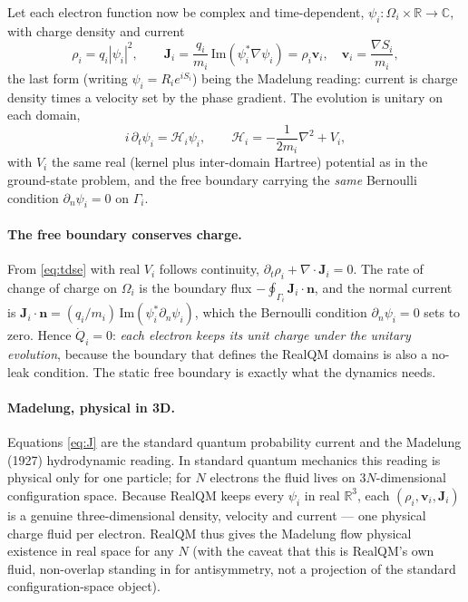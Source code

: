 \documentclass[11pt]{article}
\begin{document}
Let each electron function now be complex and time-dependent, $\psi_i:\Omega_i\times\mathbb R\to\mathbb C$,
with charge density and current
\begin{equation}
\rho_i=q_i|\psi_i|^2,\qquad
\mathbf J_i=\frac{q_i}{m_i}\,\mathrm{Im}(\psi_i^*\nabla\psi_i)=\rho_i\mathbf v_i,\quad
\mathbf v_i=\frac{\nabla S_i}{m_i},
\label{eq:J}
\end{equation}
the last form (writing $\psi_i=R_i e^{iS_i}$) being the Madelung reading: current is charge density times
a velocity set by the phase gradient. The evolution is unitary on each domain,
\begin{equation}
i\,\partial_t\psi_i=\mathcal H_i\psi_i,\qquad
\mathcal H_i=-\frac{1}{2m_i}\nabla^2+V_i,
\label{eq:tdse}
\end{equation}
with $V_i$ the same real (kernel plus inter-domain Hartree) potential as in the ground-state problem, and
the free boundary carrying the \emph{same} Bernoulli condition $\partial_n\psi_i=0$ on $\Gamma_i$.

\paragraph{The free boundary conserves charge.} From \eqref{eq:tdse} with real $V_i$ follows continuity,
$\partial_t\rho_i+\nabla\!\cdot\!\mathbf J_i=0$. The rate of change of charge on $\Omega_i$ is the boundary
flux $-\oint_{\Gamma_i}\mathbf J_i\!\cdot\!\mathbf n$, and the normal current is
$\mathbf J_i\!\cdot\!\mathbf n=(q_i/m_i)\,\mathrm{Im}(\psi_i^*\partial_n\psi_i)$, which the Bernoulli
condition $\partial_n\psi_i=0$ sets to zero. Hence $\dot Q_i=0$: \emph{each electron keeps its unit charge
under the unitary evolution}, because the boundary that defines the RealQM domains is also a no-leak
condition. The static free boundary is exactly what the dynamics needs.

\paragraph{Madelung, physical in 3D.} Equations \eqref{eq:J} are the standard quantum probability current
and the Madelung (1927) hydrodynamic reading. In standard quantum mechanics this reading is physical only
for one particle; for $N$ electrons the fluid lives on $3N$-dimensional configuration space. Because
RealQM keeps every $\psi_i$ in real $\mathbb R^3$, each $(\rho_i,\mathbf v_i,\mathbf J_i)$ is a genuine
three-dimensional density, velocity and current --- one physical charge fluid per electron. RealQM thus
gives the Madelung flow physical existence in real space for any $N$ (with the caveat that this is
RealQM's own fluid, non-overlap standing in for antisymmetry, not a projection of the standard
configuration-space object).
\end{document}
